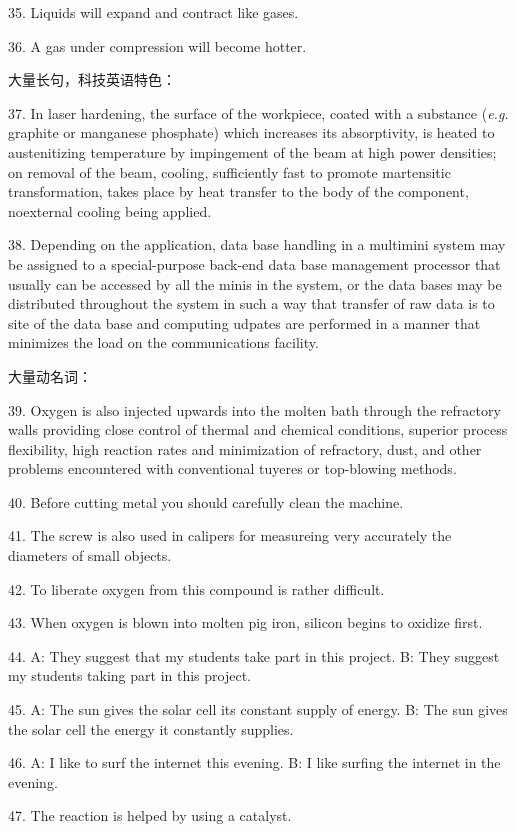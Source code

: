 \documentclass[a4paper,twocolumn,10pt]{article}
\begin{document}
\begin{CJK}{UTF8}{gkai}
35. Liquids will expand and contract like gases.

36. A gas under compression will become hotter.

大量长句，科技英语特色：

37. In laser hardening, the surface of the workpiece, coated with
a substance (\emph{e.g.} graphite or manganese phosphate) which 
increases its absorptivity, is heated to austenitizing temperature
by impingement of the beam at high power densities; on removal of
the beam, cooling, sufficiently fast to promote martensitic
transformation, takes place by heat transfer to the body of the
component, noexternal cooling being applied.

38. Depending on the application, data base handling in a multimini
system may be assigned to a special-purpose back-end data base
management processor that usually can be accessed by all the minis
in the system, or the data bases may be distributed throughout
the system in such a way that transfer of raw data is to site of the 
data base and computing udpates are performed in a manner that minimizes
the load on the communications facility.

大量动名词：

39. Oxygen is also injected upwards into the molten bath through
the refractory walls providing close control of thermal and chemical
conditions, superior process flexibility, high reaction rates and
minimization of refractory, dust, and other problems encountered with
conventional tuyeres or top-blowing methods.

40. Before cutting metal you should carefully clean the machine.

41. The screw is also used in calipers for measureing very accurately
the diameters of small objects.

42. To liberate oxygen from this compound is rather difficult.

43. When oxygen is blown into molten pig iron, silicon begins
to oxidize first.

44. A: They suggest that my students take part in this project.
B: They suggest my students taking part in this project.

45. A: The sun gives the solar cell its constant supply of energy.
B: The sun gives the solar cell the energy it constantly supplies.

46. A: I like to surf the internet this evening.
B: I like surfing the internet in the evening.

47. The reaction is helped by using a catalyst.


\end{CJK}
\end{document}
